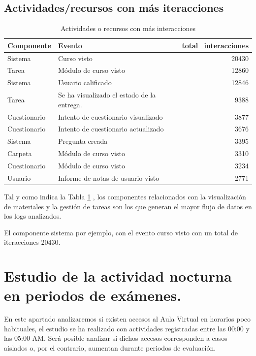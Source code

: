 \documentclass[notspecified,article,submit,moreauthors,pdftex]{Definitions/mdpi}
\begin{document}
\subsection{Actividades/recursos con más
iteracciones}\label{actividadesrecursos-con-muxe1s-iteracciones}

\begin{longtable}[t]{llr}
\caption{\label{tab:tabla-iteraccion2}Actividades o recursos con más interacciones}\\
\toprule
Componente & Evento & total\_interacciones\\
\midrule
Sistema & Curso visto & 20430\\
Tarea & Módulo de curso visto & 12860\\
Sistema & Usuario calificado & 12846\\
Tarea & Se ha visualizado el estado de la entrega. & 9388\\
Cuestionario & Intento de cuestionario visualizado & 3877\\
\addlinespace
Cuestionario & Intento de cuestionario actualizado & 3676\\
Sistema & Pregunta creada & 3395\\
Carpeta & Módulo de curso visto & 3310\\
Cuestionario & Módulo de curso visto & 3234\\
Usuario & Informe de notas de usuario visto & 2771\\
\bottomrule
\end{longtable}

Tal y como indica la Tabla \ref{tab:tabla-iteraccion2} , los componentes
relacionados con la visualización de materiales y la gestión de tareas
son los que generan el mayor flujo de datos en los logs analizados.

El componente sistema por ejemplo, con el evento curso visto con un
total de iteracciones 20430.

\section{Estudio de la actividad nocturna en periodos de
exámenes.}\label{estudio-de-la-actividad-nocturna-en-periodos-de-exuxe1menes.}

En este apartado analizaremos si existen accesos al Aula Virtual en
horarios poco habituales, el estudio se ha realizado con actividades
registradas entre las 00:00 y las 05:00 AM. Será posible analizar si
dichos accesos corresponden a casos aislados o, por el contrario,
aumentan durante periodos de evaluación.
\end{document}
